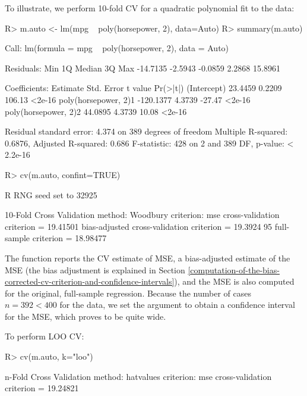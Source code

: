 \documentclass[
]{jss}
\begin{document}
To illustrate, we perform 10-fold CV for a quadratic polynomial fit to
the  data:

\begin{CodeChunk}
\begin{CodeInput}
R> m.auto <- lm(mpg ~ poly(horsepower, 2), data=Auto)
R> summary(m.auto)
\end{CodeInput}
\begin{CodeOutput}

Call:
lm(formula = mpg ~ poly(horsepower, 2), data = Auto)

Residuals:
     Min       1Q   Median       3Q      Max 
-14.7135  -2.5943  -0.0859   2.2868  15.8961 

Coefficients:
                      Estimate Std. Error t value Pr(>|t|)
(Intercept)            23.4459     0.2209  106.13   <2e-16
poly(horsepower, 2)1 -120.1377     4.3739  -27.47   <2e-16
poly(horsepower, 2)2   44.0895     4.3739   10.08   <2e-16

Residual standard error: 4.374 on 389 degrees of freedom
Multiple R-squared:  0.6876,    Adjusted R-squared:  0.686 
F-statistic:   428 on 2 and 389 DF,  p-value: < 2.2e-16
\end{CodeOutput}
\begin{CodeInput}
R> cv(m.auto, confint=TRUE)
\end{CodeInput}
\begin{CodeOutput}
R RNG seed set to 32925
\end{CodeOutput}
\begin{CodeOutput}
10-Fold Cross Validation
method: Woodbury
criterion: mse
cross-validation criterion = 19.41501
bias-adjusted cross-validation criterion = 19.3924
95%
full-sample criterion = 18.98477 
\end{CodeOutput}
\end{CodeChunk}

The function reports the CV estimate of MSE, a bias-adjusted estimate of
the MSE (the bias adjustment is explained in Section
\ref{computation-of-the-bias-corrected-cv-criterion-and-confidence-intervals}),
and the MSE is also computed for the original, full-sample regression.
Because the number of cases \(n = 392 < 400\) for the  data,
we set the argument  to obtain a confidence interval
for the MSE, which proves to be quite wide.

To perform LOO CV:

\begin{CodeChunk}
\begin{CodeInput}
R> cv(m.auto, k="loo")
\end{CodeInput}
\begin{CodeOutput}
n-Fold Cross Validation
method: hatvalues
criterion: mse
cross-validation criterion = 19.24821
\end{CodeOutput}
\end{CodeChunk}
\end{document}
